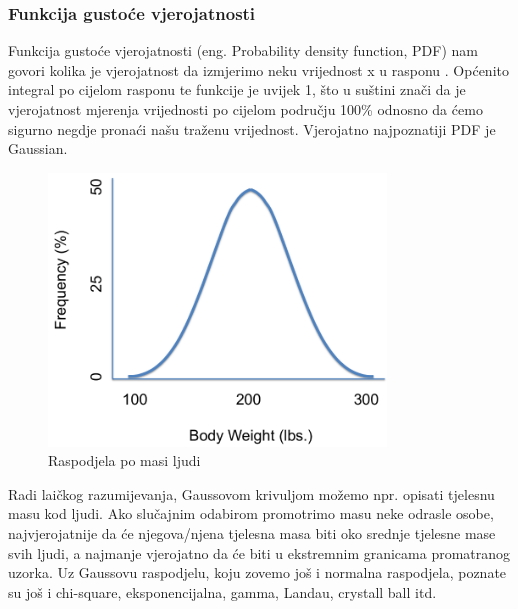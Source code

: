 \documentclass[12pt,a4paper,oneside]{article}
\begin{document}
\begin{linenumbers}
		\subsubsection{Funkcija gustoće vjerojatnosti}
		Funkcija gustoće vjerojatnosti (eng. Probability density function, PDF) nam govori kolika je vjerojatnost da izmjerimo neku vrijednost x u rasponu \begin{math}[x-dx, x+dx]
		\end{math}. Općenito integral po cijelom rasponu te funkcije je uvijek 1, što u suštini znači da je vjerojatnost mjerenja vrijednosti po cijelom području 100\% odnosno da ćemo sigurno negdje pronaći našu traženu vrijednost.
		Vjerojatno najpoznatiji PDF je Gaussian. 
		\begin{figure}[h!]
			\centering
			\includegraphics[width=0.8\textwidth]{gauus.png}
			\caption[Saturn viđen u ultraljubičastom svjetlu.]{\label{sl:gauss} Raspodjela po masi ljudi }
		\end{figure}
		Radi laičkog razumijevanja, Gaussovom krivuljom možemo npr. opisati tjelesnu masu kod ljudi. Ako slučajnim odabirom promotrimo masu neke odrasle osobe, najvjerojatnije da će njegova/njena tjelesna masa biti oko srednje tjelesne mase svih ljudi, a najmanje vjerojatno da će biti u ekstremnim granicama promatranog uzorka. Uz Gaussovu raspodjelu, koju zovemo još i normalna raspodjela, poznate su još i chi-square, eksponencijalna, gamma, Landau, crystall ball itd.
		

\end{linenumbers}
\end{document}
